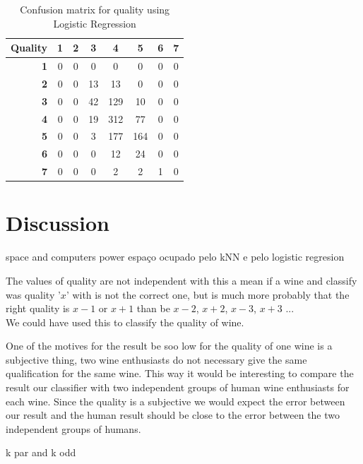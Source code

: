 \documentclass[twoside]{article}
\begin{document}
\begin{multicols}{2}
\begin{table}[H]
\caption{Confusion matrix for quality using Logistic Regression}
\centering
\begin{tabular}{r||c|c|c|c|c|c|c}
\textbf{Quality} & \textbf{1} & \textbf{2} & \textbf{3} & \textbf{4} & \textbf{5} & \textbf{6} & \textbf{7}\\
\hline \hline
\textbf{1} & 0 & 0 & 0 & 0 & 0 & 0 & 0\\
\hline
\textbf{2} & 0 & 0 & 13 & 13 & 0 & 0 & 0\\
\hline
\textbf{3} & 0 & 0 & 42 & 129 & 10 & 0 & 0\\
\hline
\textbf{4} & 0 & 0 & 19 & 312 & 77 & 0 & 0\\
\hline
\textbf{5} & 0 & 0 & 3 & 177 & 164 & 0 & 0\\
\hline
\textbf{6} & 0 & 0 & 0 & 12 & 24 & 0 & 0\\
\hline
\textbf{7} & 0 & 0 & 0 & 2 & 2 & 1 & 0\\
\end{tabular}
\end{table}



\section{Discussion}

space and computers power
espaço ocupado pelo kNN e pelo logistic regresion

The values of quality are not independent with this a mean if a wine and classify was quality '$x$' with is not the correct one, but is much more probably that the right quality is $x-1$ or $x+1$ than be $x-2$, $x+2$, $x-3$, $x+3$ ... \\
We could have used this to classify the quality of wine.


One of the motives for the result be soo low for the quality of one wine is a subjective thing, two wine enthusiasts do not necessary give the same qualification for the same wine. This way it would be interesting to compare the result our classifier with two independent groups of human wine enthusiasts for each wine. Since the quality is a subjective we would expect the error between our result and the human result should be close to the error between the two independent groups of humans.





k par and k odd 



\end{multicols}
\end{document}
